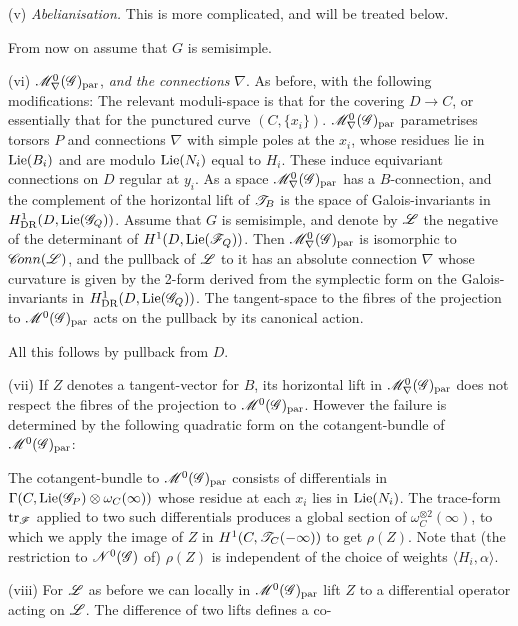 \documentclass[12pt,english]{smfart}
\theoremstyle{plain} \newtheorem{innerthm}{Theorem} \newtheorem{innerlem}{Lemma} \newtheorem{innerprop}{Proposition} \newtheorem{innercor}{Corollary} \theoremstyle{definition} \newtheorem{innerdefn}{Definition} \newtheorem{innerconstr}{Construction} \theoremstyle{remark} \newtheorem*{remark}{Remark} \newtheorem*{remarks}{Remarks} \newtheorem*{applications}{Applications}
\begin{document}
(v) \textit{Abelianisation.} This is more complicated, and will be treated below.

From now on assume that $G$ is semisimple.

(vi) $\mathscr{M}^0_\nabla(\mathscr{G})_{\mathrm{par}}$, \textit{and the connections} $\nabla$. As before, with the following modifications: The relevant moduli-space is that for the covering $D\to C$, or essentially that for the punctured curve $(C,\{x_i\})$. $\mathscr{M}^0_\nabla(\mathscr{G})_{\mathrm{par}}$ parametrises torsors $P$ and connections $\nabla$ with simple poles at the $x_i$, whose residues lie in $\operatorname{Lie}(B_i)$ and are modulo $\operatorname{Lie}(N_i)$ equal to $H_i$. These induce equivariant connections on $D$ regular at $y_i$. As a space $\mathscr{M}^0_\nabla(\mathscr{G})_{\mathrm{par}}$ has a $B$-connection, and the complement of the horizontal lift of $\mathscr{T}_B$ is the space of Galois-invariants in $H_{\mathrm{DR}}^1(D,\operatorname{Lie}(\mathscr{G}_Q))$. Assume that $G$ is semisimple, and denote by $\mathscr{L}$ the negative of the determinant of $H^1(D,\operatorname{Lie}(\mathscr{F}_Q))$. Then $\mathscr{M}^0_\nabla(\mathscr{G})_{\mathrm{par}}$ is isomorphic to $\mathscr{C}\!onn(\mathscr{L})$, and the pullback of $\mathscr{L}$ to it has an absolute connection $\nabla$ whose curvature is given by the 2-form derived from the symplectic form on the Galois-invariants in $H_{\mathrm{DR}}^1(D,\operatorname{Lie}(\mathscr{G}_Q))$. The tangent-space to the fibres of the projection to $\mathscr{M}^0(\mathscr{G})_{\mathrm{par}}$ acts on the pullback by its canonical action.

All this follows by pullback from $D$.

(vii) If $Z$ denotes a tangent-vector for $B$, its horizontal lift in $\mathscr{M}^0_\nabla(\mathscr{G})_{\mathrm{par}}$ does not respect the fibres of the projection to $\mathscr{M}^0(\mathscr{G})_{\mathrm{par}}$. However the failure is determined by the following quadratic form on the cotangent-bundle of $\mathscr{M}^0(\mathscr{G})_{\mathrm{par}}$:

The cotangent-bundle to $\mathscr{M}^0(\mathscr{G})_{\mathrm{par}}$ consists of differentials in $\Gamma(C,\operatorname{Lie}(\mathscr{G}_P)\otimes\omega_C(\infty))$ whose residue at each $x_i$ lies in $\operatorname{Lie}(N_i)$. The trace-form $\operatorname{tr}_{\mathscr{F}}$ applied to two such differentials produces a global section of $\omega_C^{\otimes2}(\infty)$, to which we apply the image of $Z$ in $H^1(C,\mathscr{T}_C(-\infty))$ to get $\rho(Z)$. Note that (the restriction to $\mathscr{N}^0(\mathscr{G})$ of) $\rho(Z)$ is independent of the choice of weights $\langle H_i,\alpha\rangle$.

(viii) For $\mathscr{L}$ as before we can locally in $\mathscr{M}^0(\mathscr{G})_{\mathrm{par}}$ lift $Z$ to a differential operator acting on $\mathscr{L}$. The difference of two lifts defines a co-
\end{document}
